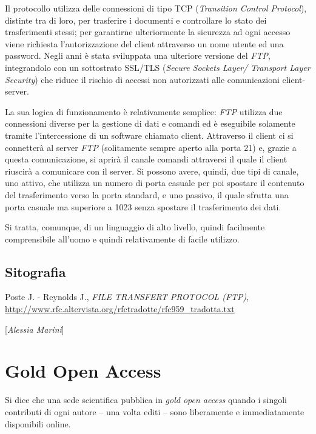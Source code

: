{Il protocollo utilizza delle connessioni di tipo TCP (\emph{Transition
Control Protocol}), distinte tra di loro, per trasferire i documenti e
controllare lo stato dei trasferimenti stessi; per garantirne
ulteriormente la sicurezza ad ogni accesso viene richiesta
l'autorizzazione del client attraverso un nome utente ed una password.
Negli anni è stata sviluppata una ulteriore versione del \emph{FTP},
integrandolo con un sottostrato SSL/TLS (\emph{Secure Sockets Layer/
Transport Layer Security}) che riduce il rischio di accessi non
autorizzati alle comunicazioni client-server.

La sua logica di funzionamento è relativamente semplice: \emph{FTP}
utilizza due connessioni diverse per la gestione di dati e comandi ed è
eseguibile solamente tramite l'intercessione di un software chiamato
client. Attraverso il client ci si connetterà al server \emph{FTP}
(solitamente sempre aperto alla porta 21) e, grazie a questa
comunicazione, si aprirà il canale comandi attraversi il quale il client
riuscirà a comunicare con il server. Si possono avere, quindi, due tipi
di canale, uno attivo, che utilizza un numero di porta casuale per poi
spostare il contenuto del trasferimento verso la porta standard, e uno
passivo, il quale sfrutta una porta casuale ma superiore a 1023 senza
spostare il trasferimento dei dati.

Si tratta, comunque, di un linguaggio di alto livello, quindi facilmente
comprensibile all'uomo e quindi relativamente di facile utilizzo.

\section*{Sitografia}
{\parindent0pt 
Poste J. - Reynolds J., \emph{FILE TRANSFERT PROTOCOL (FTP)},
\url{http://www.rfc.altervista.org/rfctradotte/rfc959_tradotta.txt}

}

\hrulefill 

{[}\emph{Alessia Marini}{]}




\chapter{Gold Open Access}

Si dice che una sede scientifica pubblica in \emph{gold open access}
quando i singoli contributi di ogni autore -- una volta editi -- sono
liberamente e immediatamente disponibili online.

}
